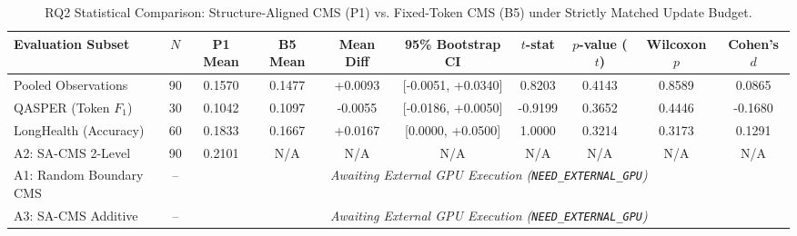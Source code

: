 \begin{table}[t]
\centering
\small
\caption{RQ2 Statistical Comparison: Structure-Aligned CMS (P1) vs. Fixed-Token CMS (B5) under Strictly Matched Update Budget.}
\label{tab:rq2_comparison}
\begin{tabular}{lccccccccc}
\toprule
\textbf{Evaluation Subset} & \textbf{$N$} & \textbf{P1 Mean} & \textbf{B5 Mean} & \textbf{Mean Diff} & \textbf{95\% Bootstrap CI} & \textbf{$t$-stat} & \textbf{$p$-value ($t$)} & \textbf{Wilcoxon $p$} & \textbf{Cohen's $d$} \\
\midrule
Pooled Observations        & 90 & 0.1570 & 0.1477 & +0.0093 & [-0.0051, +0.0340] & 0.8203  & 0.4143 & 0.8589 & 0.0865 \\
QASPER (Token $F_1$)       & 30 & 0.1042 & 0.1097 & -0.0055 & [-0.0186, +0.0050] & -0.9199 & 0.3652 & 0.4446 & -0.1680 \\
LongHealth (Accuracy)      & 60 & 0.1833 & 0.1667 & +0.0167 & [0.0000, +0.0500]  & 1.0000  & 0.3214 & 0.3173 & 0.1291 \\
\midrule
A2: SA-CMS 2-Level         & 90 & 0.2101 & N/A    & N/A     & N/A                & N/A     & N/A    & N/A    & N/A \\
A1: Random Boundary CMS    & -- & \multicolumn{8}{c}{\textit{Awaiting External GPU Execution (\texttt{NEED\_EXTERNAL\_GPU})}} \\
A3: SA-CMS Additive        & -- & \multicolumn{8}{c}{\textit{Awaiting External GPU Execution (\texttt{NEED\_EXTERNAL\_GPU})}} \\
\bottomrule
\end{tabular}
\end{table}
